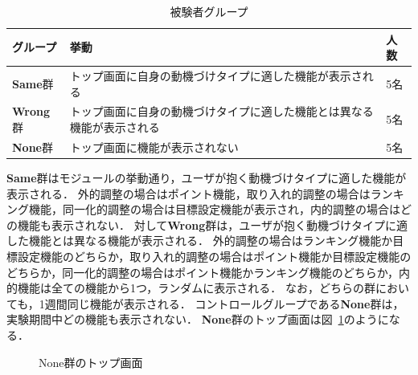 \begin{table}[htb]
\begin{center}
  \begin{tabular}{|l|l|l|} \hline
    グループ & 挙動 & 人数 \\ \hline
	{\bf Same}群 & トップ画面に自身の動機づけタイプに適した機能が表示される & 5名 \\
    {\bf Wrong}群 & トップ画面に自身の動機づけタイプに適した機能とは異なる機能が表示される & 5名 \\
    {\bf None}群 & トップ画面に機能が表示されない & 5名 \\ \hline
  \end{tabular}
  \caption{被験者グループ}
  \label{tb:group}
\end{center}
\end{table}

{\bf Same}群はモジュールの挙動通り，ユーザが抱く動機づけタイプに適した機能が表示される．
外的調整の場合はポイント機能，取り入れ的調整の場合はランキング機能，同一化的調整の場合は目標設定機能が表示され，内的調整の場合はどの機能も表示されない．
対して{\bf Wrong}群は，ユーザが抱く動機づけタイプに適した機能とは異なる機能が表示される．
外的調整の場合はランキング機能か目標設定機能のどちらか，取り入れ的調整の場合はポイント機能か目標設定機能のどちらか，同一化的調整の場合はポイント機能かランキング機能のどちらか，内的機能は全ての機能から1つ，ランダムに表示される．
なお，どちらの群においても，1週間同じ機能が表示される．
コントロールグループである{\bf None}群は，実験期間中どの機能も表示されない．
{\bf None}群のトップ画面は図~\ref{fig:none_group}のようになる．

\begin{figure}[hb]
	\begin{center}
	\caption{None群のトップ画面}
	\label{fig:none_group}
	\end{center}
\end{figure}

